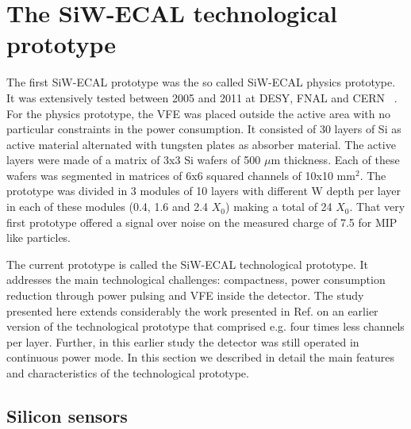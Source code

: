 \documentclass[a4paper,11pt]{article}
\begin{document}
\section{The SiW-ECAL technological prototype}

The first SiW-ECAL prototype was the so called SiW-ECAL physics prototype.
It was extensively tested between 2005 and 2011 at DESY, FNAL and CERN ~\cite{Adloff:2011ha,Anduze:2008hq,Adloff:2008aa,Adloff:2010xj,CALICE:2011aa,Bilki:2014uep}. 
For the physics prototype, the VFE was placed outside the active area with no particular constraints in the power consumption.
It consisted of 30 layers of Si as active material alternated with tungsten plates as absorber material.
The active layers were made of a matrix of 3x3 Si wafers of 500 $\mu$m thickness. Each of these wafers was segmented in matrices of
6x6 squared channels of 10x10 mm$^{2}$.
The prototype was divided in 3 modules of 10 layers with different W depth per layer in each of these modules
(0.4, 1.6 and 2.4 $X_{0}$) making a total of 24 $X_{0}$.
That very first prototype offered a signal over noise on the measured charge of 7.5 for MIP like 
particles.

The current prototype is called the SiW-ECAL technological prototype. It addresses the main technological challenges: compactness,
power consumption reduction through power pulsing and VFE inside the detector.
The study presented here extends considerably the work presented in Ref. \cite{Amjad:2014tha} 
on an earlier version of the technological prototype that comprised 
e.g. four times less channels per layer. 
Further, in this earlier study the detector was still operated in continuous power mode.
In this section we described in detail
the main features and characteristics of the technological prototype.

\subsection{Silicon sensors}
\label{sec:wafers}
\end{document}
